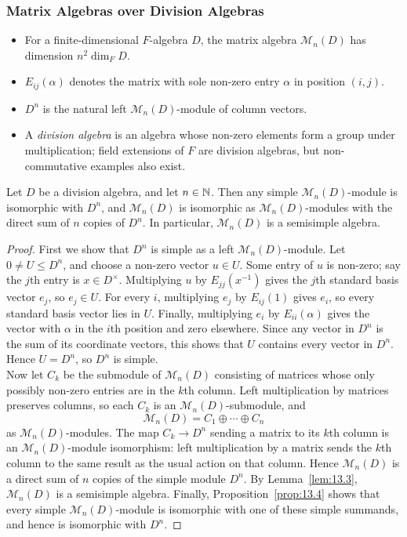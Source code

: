\documentclass[../Odyssey_Project.tex]{subfiles}
\begin{document}
\subsubsection*{Matrix Algebras over Division Algebras}
\begin{itemize}
    \item For a finite-dimensional $F$-algebra $D$, the matrix algebra $\mathcal{M}_n(D)$ has dimension $n^2 \dim_F D$.
    \item $E_{ij}(\alpha)$ denotes the matrix with sole non-zero entry $\alpha$ in position $(i,j)$.
    \item $D^n$ is the natural left $\mathcal{M}_n(D)$-module of column vectors.
    \item A \emph{division algebra} is an algebra whose non-zero elements form a group under multiplication; field extensions of $F$ are division algebras, but non-commutative examples also exist.
\end{itemize}

\begin{theorem}
\label{thm:13.6}
Let $D$ be a division algebra, and let $n \in \mathbb{N}$. Then any simple $\mathcal{M}_n(D)$-module is isomorphic with $D^n$, and $\mathcal{M}_n(D)$ is isomorphic as $\mathcal{M}_n(D)$-modules with the direct sum of $n$ copies of $D^n$. In particular, $\mathcal{M}_n(D)$ is a semisimple algebra.
\end{theorem}
\begin{proof}
    First we show that $D^n$ is simple as a left $\mathcal{M}_n(D)$-module. Let $0 \neq U \leq D^n$, and choose a non-zero vector $u \in U$. Some entry of $u$ is non-zero; say the $j$th entry is $x \in D^\times$. Multiplying $u$ by $E_{jj}(x^{-1})$ gives the $j$th standard basis vector $e_j$, so $e_j \in U$. For every $i$, multiplying $e_j$ by $E_{ij}(1)$ gives $e_i$, so every standard basis vector lies in $U$. Finally, multiplying $e_i$ by $E_{ii}(\alpha)$ gives the vector with $\alpha$ in the $i$th position and zero elsewhere. Since any vector in $D^n$ is the sum of its coordinate vectors, this shows that $U$ contains every vector in $D^n$. Hence $U = D^n$, so $D^n$ is simple.\\
    Now let $C_k$ be the submodule of $\mathcal{M}_n(D)$ consisting of matrices whose only possibly non-zero entries are in the $k$th column. Left multiplication by matrices preserves columns, so each $C_k$ is an $\mathcal{M}_n(D)$-submodule, and
    \[
        \mathcal{M}_n(D) = C_1 \oplus \cdots \oplus C_n
    \]
    as $\mathcal{M}_n(D)$-modules. The map $C_k \to D^n$ sending a matrix to its $k$th column is an $\mathcal{M}_n(D)$-module isomorphism: left multiplication by a matrix sends the $k$th column to the same result as the usual action on that column. Hence $\mathcal{M}_n(D)$ is a direct sum of $n$ copies of the simple module $D^n$. By Lemma~\ref{lem:13.3}, $\mathcal{M}_n(D)$ is a semisimple algebra. Finally, Proposition~\ref{prop:13.4} shows that every simple $\mathcal{M}_n(D)$-module is isomorphic with one of these simple summands, and hence is isomorphic with $D^n$.
\end{proof}
\end{document}
